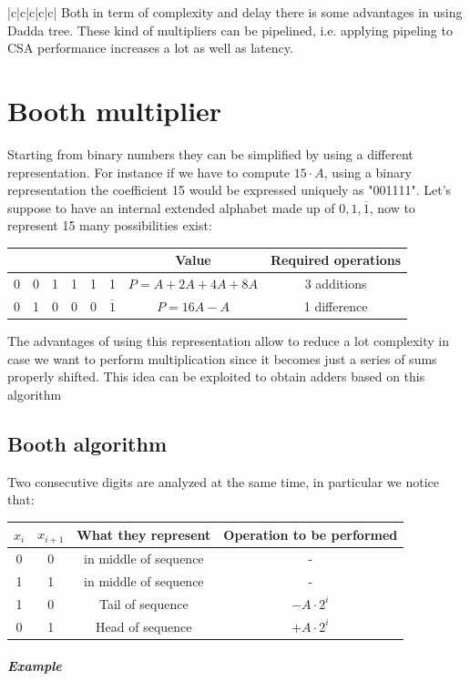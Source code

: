 \begin{center}
\begin{tabular}{|c|c|c|c|c|}
Both in term of complexity and delay there is some advantages in using Dadda tree. These kind of multipliers can be pipelined, i.e. applying pipeling to CSA performance increases a lot as well as latency.

\section{Booth multiplier}

Starting from binary numbers they can be simplified by using a different representation. For instance if we have to compute  $15 \cdot A$, using a binary representation the coefficient 15 would be expressed uniquely as "001111". Let's suppose to have an internal extended alphabet made up of ${0,1,\overline{1}}$, now to represent 15 many possibilities exist:

\begin{center}
  \begin{tabular}{|c|c|c|c|c|c|c|c|}
    \hline
     & & & & & & Value & Required operations\\
    \hline
    0&  0&  1&  1&  1&  1&        $P=A+2A+4A+8A$&   3 additions\\
    0&  1&  0&  0&  0&  $\overline{1}$& $P=16A-A$&      1 difference\\
    \hline
  \end{tabular}
\end{center}

The advantages of using this representation allow to reduce a lot complexity in case we want to perform multiplication since it becomes just a series of sums properly shifted. This idea can be exploited to obtain adders based on this algorithm

\subsection{Booth algorithm}
Two consecutive digits are analyzed at the same time, in particular we notice that:
\begin{center}
\begin{tabular}{|c|c|c|c|}
  \hline
  $x_i$&  $x_{i+1}$&  What they represent&  Operation to be performed\\
  \hline
  0&    0&      in middle of sequence&  -\\
  1&    1&      in middle of sequence&  -\\
  1&    0&      Tail of sequence&   $-A \cdot 2^i$\\
  0&    1&      Head of sequence&   $+A \cdot 2^i$\\
  \hline
\end{tabular}
\end{center}
\subparagraph{Example}


\end{tabular}
\end{center}
